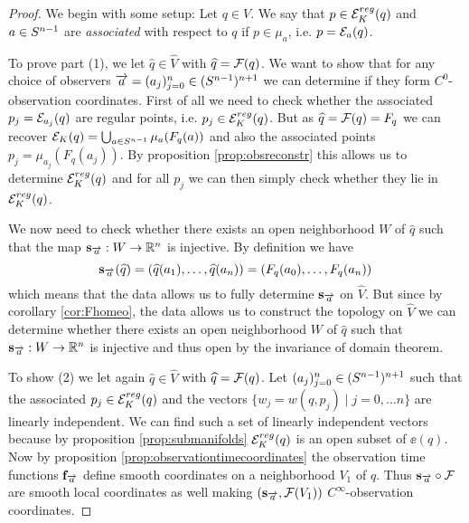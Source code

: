 \begin{proof}
    We begin with some setup: Let $q\in V$. We say that $p\in \er(q)$ and $a\in \sn$ are \emph{associated} with respect to $q$ if $p\in \mu_a$, i.e. $p=\mc{E}_a(q)$. 
    
    To prove part (1), we let $\widehat{q}\in \widehat{V}$ with $\widehat{q}=\F(q)$. We want to show that for any choice of observers $\aa=(a_j)^n_{j=0}\in (\sn)^{n+1}$ we can determine if they form $C^0$-observation coordinates. First of all we need to check whether the associated $p_j=\mc{E}_{a_j}(q)$ are regular points, i.e. $p_j\in \er(q)$. But as $\widehat{q}=\F(q) = F_q$ we can recover $\ee(q)=\bigcup_{a\in \sn}\mu_a(F_q(a))$ and also the associated points $p_j = \mu_{a_j}(F_q(a_j))$. By proposition \ref{prop:obsreconstr} this allows us to determine $\er(q)$ and for all $p_j$ we can then simply check whether they lie in $\er(q)$.
    
    We now need to check whether there exists an open neighborhood $W$ of $\widehat{q}$ such that the map $\mathbf{s}_\aa:W\to\R^n$ is injective. 
    By definition we have 
    \[
    \mathbf{s}_\aa(\widehat{q}) = (\widehat{q}(a_1),\dots,\widehat{q}(a_n)) = (F_q(a_0), \dots ,F_q(a_n))
    \] which means that the data allows us to fully determine $\mathbf{s}_\aa$ on $\widehat{V}$. But since by corollary \ref{cor:Fhomeo}, the data allows us to construct the topology on $\widehat{V}$ we can determine whether there exists an open neighborhood $W$ of $\widehat{q}$ such that $\mathbf{s}_\aa:W\to \R^n$ is injective and thus open by the invariance of domain theorem.
    

    To show (2) we let again $\widehat{q}\in \widehat{V}$ with $\widehat{q}=\F(q)$. 
    Let $(a_j)_{j=0}^n \in (\sn)^{n+1}$ such that the associated $p_j \in \er(q)$ and the vectors $\{w_j = w(q,p_j)\mid j=0,\dots n\}$ are linearly independent. We can find such a set of linearly independent vectors because by proposition \ref{prop:submanifolds} $\er(q)$ is an open subset of $\ee(q)$. Now by proposition \ref{prop:observationtimecoordinates} the observation time functions $\mathbf{f}_\aa$ define smooth coordinates on a neighborhood $V_1$ of $q$. Thus $\mathbf{s}_\aa\circ\F$ are smooth local coordinates as well making $(\mathbf{s}_\aa,\F(V_1))$ $C^\infty$-observation coordinates.


\end{proof}
